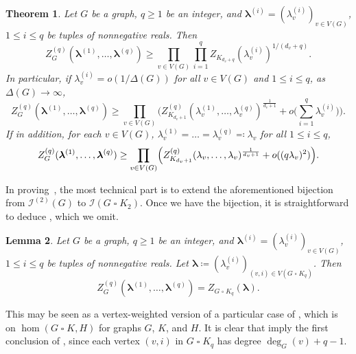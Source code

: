 \documentclass{article}
\numberwithin{equation}{section}
\theoremstyle{plain}
\newtheorem{theorem}{Theorem}[section]
\newtheorem{lemma}[theorem]{Lemma}
\theoremstyle{definition}
\theoremstyle{remark} %
\newcommand{\defeq}{\coloneqq}
\newcommand{\eqdef}{\eqqcolon}
\newcommand{\calI}{\mathcal{I}}
\newcommand{\blambda}{\bm{\lambda}}
\newcommand{\cart}{\mathbin{\square}} %
\begin{document}
\begin{theorem}\label{thm:semiproper-colouring-poly-multiaff-lower-bd-weak}
    Let \(G\) be a graph, \(q\ge1\) be an integer, and \(\blambda^{(i)}=(\lambda^{(i)}_v)_{v\in V(G)}\), \(1\le i\le q\) be tuples of nonnegative reals. Then
    \[
        Z^{(q)}_G(\blambda^{(1)}, \dots, \blambda^{(q)})
        \ge \prod_{v\in V(G)} \prod_{i=1}^q Z_{K_{d_v+q}} (\lambda^{(i)}_v)^{1/(d_v+q)}.
    \]
    In particular, if \(\lambda^{(i)}_v=o(1/\Delta(G))\) for all \(v\in V(G)\) and \(1\le i\le q\), as \(\Delta(G)\to \infty\),
    \[
        Z^{(q)}_G(\blambda^{(1)}, \dots, \blambda^{(q)})
        \ge \prod_{v\in V(G)} \biggl( Z^{(q)}_{K_{d_v+1}} (\lambda^{(1)}_v,\dots,\lambda^{(q)}_v) ^{\frac{1}{d_v+1}} + o\biggl(\sum_{i=1}^q \lambda^{(i)}_v\biggr) \biggr).
    \]
    If in addition, for each \(v\in V(G)\), \(\lambda^{(1)}_v=\dots=\lambda^{(q)}_v\eqdef \lambda_v\) for all \(1\le i\le q\),
    \[
        Z^{(q)}_G(\blambda^{(1)}, \dots, \blambda^{(q)})
        \ge \prod_{v\in V(G)} \Bigl( Z^{(q)}_{K_{d_v+1}} (\lambda_v,\dots,\lambda_v) ^{\frac{1}{d_v+1}} + o((q\lambda_v)^2) \Bigr).
    \]
\end{theorem}

In proving~, the most technical part is to extend the aforementioned bijection from \(\calI^{(2)}(G)\) to \(\calI(G\cart K_2)\). Once we have the bijection, it is straightforward to deduce , which we omit.

\begin{lemma}\label{lem:multiaffine-equal}
    Let \(G\) be a graph, \(q\ge1\) be an integer, and \(\blambda^{(i)}=(\lambda^{(i)}_v)_{v\in V(G)}\), \(1\le i\le q\) be tuples of nonnegative reals. Let \(\blambda\defeq (\lambda^{(i)}_v)_{(v,i)\in V(G\cart K_q)}\). Then
    \[
        Z^{(q)}_G(\blambda^{(1)}, \dots, \blambda^{(q)})
        = Z_{G\cart K_q}(\blambda).
    \]
\end{lemma}

This may be seen as a vertex-weighted version of a particular case of \cite[Lemma~3.1]{kim2016sidorenko}, which is on \(\hom(G\cart K,H)\) for graphs \(G\), \(K\), and \(H\).
It is clear that  imply the first conclusion of , since each vertex \((v,i)\) in \(G\cart K_q\) has degree \(\deg_G(v)+q-1\).
\end{document}
